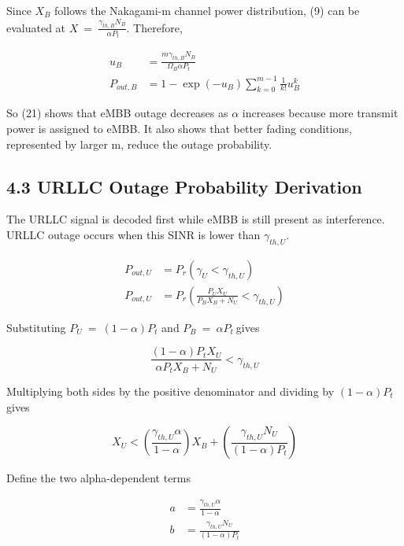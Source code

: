 \documentclass[
]{article}
\begin{document}
Since \(X_{B}\) follows the Nakagami-m channel power distribution, (9) can be evaluated at \(X\  = \ \frac{\gamma_{th,B}N_{B}}{\ \alpha P_{t}}\). Therefore,

\begin{align}
u_{B} &= \frac{m \gamma_{th,B} N_{B}}{\Omega_{B} \alpha P_{t}} \\[1ex]
P_{out,B} &= 1 - \exp(-u_{B}) \sum_{k=0}^{m-1} \frac{1}{k!} u_{B}^{k}
\end{align}

So (21) shows that eMBB outage decreases as \(α\) increases because
more transmit power is assigned to eMBB. It also shows that better
fading conditions, represented by larger m, reduce the outage
probability.

\subsection{4.3 URLLC Outage Probability
Derivation}\label{urllc-outage-probability-derivation}

The URLLC signal is decoded first while eMBB is still present as
interference. URLLC outage occurs when this SINR is lower than
\(\gamma_{th,U}\).

\begin{align}
P_{out,U} &= P_{r}\left( \gamma_{U} < \gamma_{th,U} \right) \\[1ex]
P_{out,U} &= P_{r}\left( \frac{P_{U} X_{U}}{P_{B} X_{B} + N_{U}} < \gamma_{th,U} \right)
\end{align}

Substituting \(P_{U}\  = \ (1 - \alpha)P_{t}\) and
\(P_{B}\  = \ \alpha P_{t}\ \)gives

\begin{equation}
\frac{(1 - \alpha)P_{t} X_{U}}{\alpha P_{t} X_{B} + N_{U}} < \gamma_{th,U}
\end{equation}

Multiplying both sides by the positive denominator and dividing by
\((1 - \alpha)P_{t}\) gives

\begin{equation}
X_{U} < \left( \frac{\gamma_{th,U} \alpha}{1 - \alpha} \right) X_{B} + \left( \frac{\gamma_{th,U} N_{U}}{(1 - \alpha)P_{t}} \right)
\end{equation}

Define the two alpha-dependent terms

\begin{align}
a &= \frac{\gamma_{th,U} \alpha}{1 - \alpha} \\[1ex]
b &= \frac{\gamma_{th,U} N_{U}}{(1 - \alpha)P_{t}}
\end{align}
\end{document}
